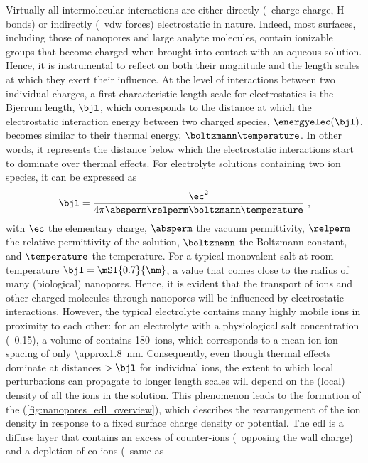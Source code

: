 Virtually all intermolecular interactions are either directly (\eg~charge-charge, H-bonds) or indirectly
(\eg~\gls{vdw} forces) electrostatic in nature. Indeed, most surfaces, including those of nanopores and large
analyte molecules, contain ionizable groups that become charged when brought into contact with an aqueous
solution. Hence, it is instrumental to reflect on both their magnitude and the length scales at which they
exert their influence. At the level of interactions between two individual charges, a first characteristic
length scale for electrostatics is the Bjerrum length, $\bjl$, which corresponds to the distance at which the
electrostatic interaction energy between two charged species, $\energyelec (\bjl)$, becomes similar to their
thermal energy, $\boltzmann \temperature$. In other words, it represents the distance below which the
electrostatic interactions start to dominate over thermal effects. For electrolyte solutions containing two
ion species, it can be expressed as~\cite{Bocquet-2010}
%
\begin{equation}\label{eq:nanopores_bjerrum_length}
  \bjl = \dfrac{\ec^2}{4 \pi \absperm \relperm \boltzmann \temperature}
  \text{ ,}
\end{equation}
%
with $\ec$ the elementary charge, $\absperm$ the vacuum permittivity, $\relperm$ the relative permittivity of
the solution, $\boltzmann$ the Boltzmann constant, and $\temperature$ the temperature. For a typical
monovalent salt at room temperature $\bjl = \mSI{0.7}{\nm}$, a value that comes close to the radius of many
(biological) nanopores. Hence, it is evident that the transport of ions and other charged molecules through
nanopores will be influenced by electrostatic interactions. However, the typical electrolyte contains many
highly mobile ions in proximity to each other: for an electrolyte with a physiological salt
concentration (\eg~\SI{0.15}{\Molar}), a volume of  contains 180~ions, which
corresponds to a mean ion-ion spacing of only \SI{\approx1.8}{\nm}. Consequently, even though thermal effects
dominate at distances $>\bjl$ for individual ions, the extent to which local perturbations can propagate to
longer length scales will depend on the (local) density of all the ions in the solution. This phenomenon leads to
the formation of the  (\cref{fig:nanopores_edl_overview}), which describes the rearrangement of
the ion density in response to a fixed surface charge density or potential. The \gls{edl} is a diffuse layer
that contains an excess of counter-ions (\ie~opposing the wall charge) and a depletion of co-ions (\ie~same as
